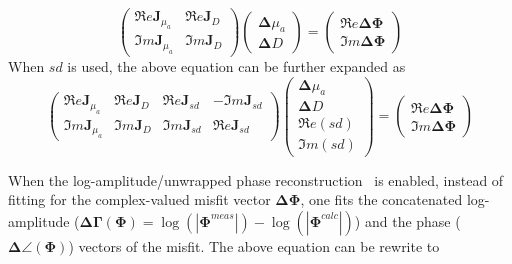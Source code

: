 \documentclass[12pt]{book}               %
\begin{document}
\begin{equation}\label{eq:singlewavelength}
\left(
\begin{array}{ll}
\Re e{\mathbf{J}}_{\mu_a} & \Re e{\mathbf{J}}_{D}\\
\Im m{\mathbf{J}}_{\mu_a} & \Im m{\mathbf{J}}_{D}
\end{array}\right)
\left(
\begin{array}{l}
\boldsymbol{\Delta}{\mu_a}\\
\boldsymbol{\Delta}{D}
\end{array}
\right)=\left(
\begin{array}{l}
\Re e{\boldsymbol{\Delta\Phi}}\\
\Im m{\boldsymbol{\Delta\Phi}}
\end{array}\right)
\end{equation}
When $sd$ is used, the above equation can be further expanded as
\begin{equation}
\label{eq:realupdate}\left(
\begin{array}{lllr}
\Re e{\mathbf{J}}_{\mu_a} & \Re e{\mathbf{J}}_{D} & \Re e{\mathbf{J}}_{sd} & -\Im m{\mathbf{J}}_{sd}\\
\Im m{\mathbf{J}}_{\mu_a} & \Im m{\mathbf{J}}_{D} & \Im m{\mathbf{J}}_{sd} & \Re e{\mathbf{J}}_{sd}
\end{array}\right)
\left(
\begin{array}{l}
\boldsymbol{\Delta}{\mu_a}\\
\boldsymbol{\Delta}{D}\\
\Re e({sd})\\
\Im m({sd})
\end{array}
\right)=\left(
\begin{array}{l}
\Re e{\boldsymbol{\Delta\Phi}}\\
\Im m{\boldsymbol{\Delta\Phi}}
\end{array}\right)
\end{equation}

When the log-amplitude/unwrapped phase reconstruction~\cite{FangThesis, Fang2006a, Meaney2007b} is enabled, instead of fitting for 
the complex-valued misfit vector $\boldsymbol{\Delta\Phi}$, one fits the concatenated log-amplitude ($\boldsymbol{\Delta\Gamma(\Phi)}=\log(|\boldsymbol{\Phi}^{meas}|)-\log(|\boldsymbol{\Phi}^{calc}|)$) and the phase ($\boldsymbol{\Delta\angle(\Phi)}$)
vectors of the misfit. The above equation can be rewrite to
\end{document}
